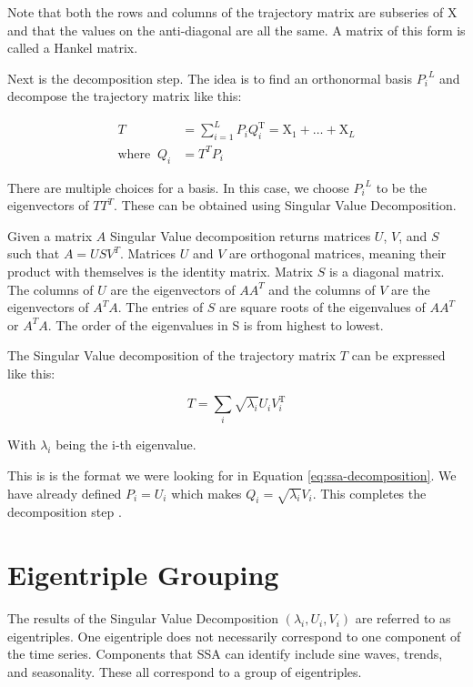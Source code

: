 Note that both the rows and columns of the trajectory matrix are subseries of X and that the values on the anti-diagonal are all the same. A matrix of this form is called a Hankel matrix. 

Next is the decomposition step. The idea is to find an orthonormal basis ${P_i}^L$ and decompose the trajectory matrix like this: 

\begin{equation}
   \begin{aligned}
   T&=\sum_{i=1}^{L} P_{i} Q_{i}^{\mathrm{T}}=\mathrm{X}_{1}+\ldots+\mathrm{X}_{L} \\
   \text{where} \;\; Q_i &= T^TP_i
   \end{aligned}
   \label{eq:ssa-decomposition}
\end{equation}

There are multiple choices for a basis. In this case, we choose ${P_i}^L$ to be the eigenvectors of $TT^T$. These can be obtained using Singular Value Decomposition. 

Given a matrix $A$ Singular Value decomposition returns matrices $U$, $V$, and $S$ such that $A = USV^T$. Matrices $U$ and $V$ are orthogonal matrices, meaning their product with themselves is the identity matrix. Matrix $S$ is a diagonal matrix. The columns of $U$ are the eigenvectors of $AA^T$ and the columns of $V$ are the eigenvectors of $A^TA$. The entries of $S$ are square roots of the eigenvalues of $AA^T$ or $A^TA$. The order of the eigenvalues in S is from highest to lowest. 

The Singular Value decomposition of the trajectory matrix $T$ can be expressed like this: 

\begin{equation}
T=\sum_{i} \sqrt{\lambda_{i}} U_{i} V_{i}^{\mathrm{T}}
\end{equation}

With $\lambda_i$ being the i-th eigenvalue.

This is is the format we were looking for in Equation \eqref{eq:ssa-decomposition}. We have already defined $P_i=U_i$ which makes $Q_i = \sqrt{\lambda_i}V_i$. This completes the decomposition step \parencite{golyandina2014basic}.

\section{Eigentriple Grouping}

The results of the Singular Value Decomposition $(\lambda_i, U_i, V_i)$ are referred to as eigentriples. One eigentriple does not necessarily correspond to one component of the time series. Components that SSA can identify include sine waves, trends, and seasonality. These all correspond to a group of eigentriples. 

